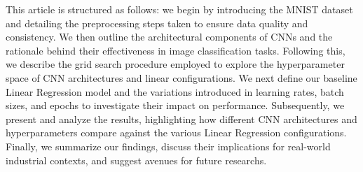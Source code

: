 This article is structured as follows: we begin by introducing the MNIST dataset and detailing the preprocessing steps taken to ensure data quality and consistency. We then outline the architectural components of CNNs and the rationale behind their effectiveness in image classification tasks. Following this, we describe the grid search procedure employed to explore the hyperparameter space of CNN architectures and linear configurations. We next define our baseline Linear Regression model and the variations introduced in learning rates, batch sizes, and epochs to investigate their impact on performance. Subsequently, we present and analyze the results, highlighting how different CNN architectures and hyperparameters compare against the various Linear Regression configurations. Finally, we summarize our findings, discuss their implications for real-world industrial contexts, and suggest avenues for future researchs.